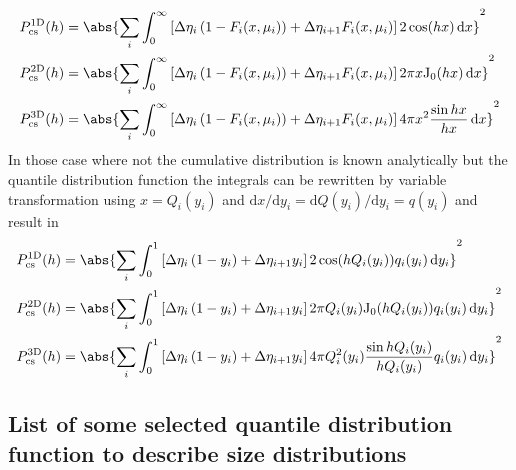 \begin{align}
  P_\textrm{cs}^\mathrm{1D}(h) & = \abs{\sum_i  \int_0^\infty \left[\Delta\eta_i\left(1-F_i(x,\mu_i)\right) +\Delta\eta_{i+1} F_i(x,\mu_i)\right] 2\cos (hx)\,\mathrm{d}x }^2 \\
  P_\textrm{cs}^\mathrm{2D}(h) & = \abs{\sum_i  \int_0^\infty \left[\Delta\eta_i\left(1-F_i(x,\mu_i)\right) +\Delta\eta_{i+1} F_i(x,\mu_i)\right] 2\pi x \textrm{J}_0(hx)\,\mathrm{d}x }^2 \\
  P_\textrm{cs}^\mathrm{3D}(h) & = \abs{\sum_i  \int_0^\infty \left[\Delta\eta_i\left(1-F_i(x,\mu_i)\right) +\Delta\eta_{i+1} F_i(x,\mu_i)\right] 4\pi x^2\frac{\sin hx}{hx}\,\mathrm{d}x }^2
\end{align}
In those case where not the cumulative distribution is known analytically but the quantile distribution function the integrals can be rewritten by variable transformation using $x=Q_i(y_i)$ and $\mathrm{d}x/\mathrm{d}y_i=\mathrm{d}Q(y_i)/\mathrm{d}y_i=q(y_i)$ and result in
\begin{align}
  P_\textrm{cs}^\mathrm{1D}(h) & = \abs{\sum_i  \int_0^1 \left[\Delta\eta_i\left(1-y_i\right) +\Delta\eta_{i+1} y_i\right] 2\cos (hQ_i(y_i))q_i(y_i)\,\mathrm{d}y_i }^2 \\
  P_\textrm{cs}^\mathrm{2D}(h) & = \abs{\sum_i  \int_0^1 \left[\Delta\eta_i\left(1-y_i\right) +\Delta\eta_{i+1} y_i\right] 2\pi Q_i(y_i) \textrm{J}_0(hQ_i(y_i))q_i(y_i)\,\mathrm{d}y_i }^2 \\
  P_\textrm{cs}^\mathrm{3D}(h) & = \abs{\sum_i  \int_0^1 \left[\Delta\eta_i\left(1-y_i\right) +\Delta\eta_{i+1} y_i\right] 4\pi Q_i^2(y_i)\frac{\sin hQ_i(y_i)}{hQ_i(y_i)}q_i(y_i)\,\mathrm{d}y_i }^2
\end{align}


\subsection{List of some selected quantile distribution function to describe size distributions} ~\\

